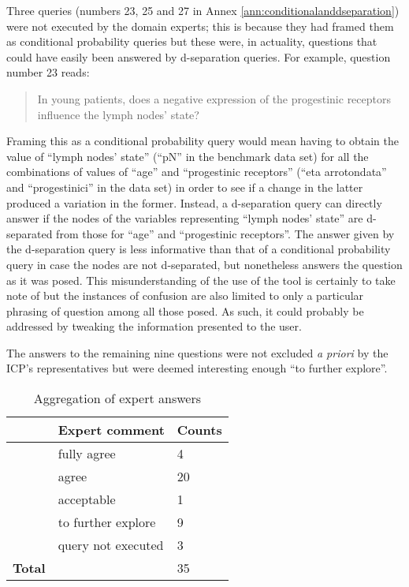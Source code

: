 Three queries (numbers 23, 25 and 27 in Annex \ref{ann:conditionalanddseparation}) were not executed by the domain experts; this is because they had framed them as conditional probability queries but these were, in actuality, questions that could have easily been answered by d-separation queries.
For example, question number 23 reads:
\begin{quotation}
	In young patients, does a negative expression of the progestinic receptors influence the lymph nodes' state?
\end{quotation}
Framing this as a conditional probability query would mean having to obtain the value of \enquote{lymph nodes' state} (\enquote{pN} in the benchmark data set) for all the combinations of values of \enquote{age} and \enquote{progestinic receptors} (\enquote{eta arrotondata} and \enquote{progestinici} in the data set) in order to see if a change in the latter produced a variation in the former.
Instead, a d-separation query can directly answer if the nodes of the variables representing \enquote{lymph nodes' state} are d-separated from those for \enquote{age} and \enquote{progestinic receptors}.
The answer given by the d-separation query is less informative than that of a conditional probability query in case the nodes are not d-separated, but nonetheless answers the question as it was posed.
This misunderstanding of the use of the tool is certainly to take note of but the instances of confusion are also limited to only a particular phrasing of question among all those posed.
As such, it could probably be addressed by tweaking the information presented to the user.

The answers to the remaining nine questions were not excluded \textit{a priori} by the ICP's representatives but were deemed interesting enough \enquote{to further explore}.

\begin{table}[h]
	\centering
	\caption{Aggregation of expert answers}
	\begin{tabularx}{0.7\textwidth}{lXl}
		\toprule
		& Expert comment & Counts  \\
		\midrule	
		& fully agree & 4 \\
		& agree & 20 \\
		& acceptable & 1 \\
		& to further explore & 9 \\
		& query not executed & 3 \\	
		\midrule
		\textbf{Total} & & 35 \\
		\bottomrule
		\end{tabularx}
	\label{tab:recapquestionsresult}
\end{table}

